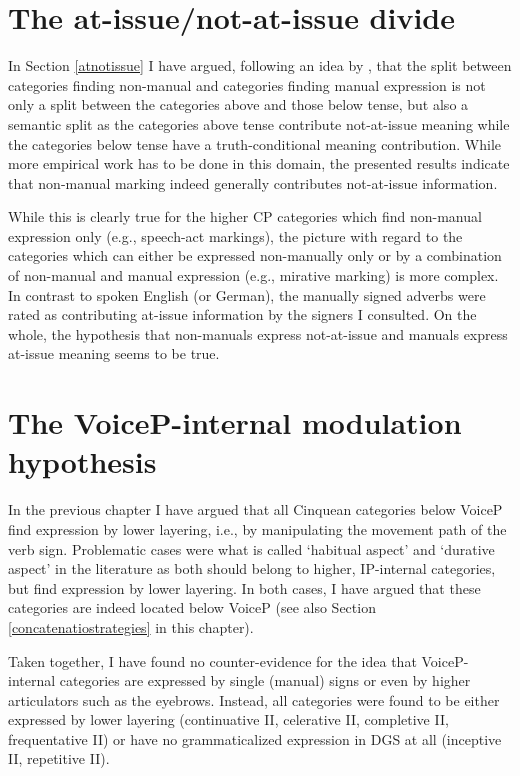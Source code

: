 \section{The at-issue/not-at-issue divide}
In Section \ref{atnotissue} I have argued, following an idea by \citet{bross2017scope}, that the split between categories finding non-manual and categories finding manual expression is not only a split between the categories above and those below tense, but also a semantic split as the categories above tense contribute not-at-issue meaning while the categories below tense have a truth-conditional meaning contribution. While more empirical work has to be done in this domain, the presented results indicate that non-manual marking indeed generally contributes not-at-issue information. 

While this is clearly true for the higher CP categories which find non-manual expression only (e.g., speech-act markings), the picture with regard to the categories which can either be expressed non-manually only or by a combination of non-manual and manual expression (e.g., mirative marking) is more complex. In contrast to spoken English (or German), the manually signed adverbs were rated as contributing at-issue information by the signers I consulted. On the whole, the hypothesis that non-manuals express not-at-issue and manuals express at-issue meaning seems to be true. %





\section{The VoiceP-internal modulation hypothesis}
In the previous chapter I have argued that all Cinquean categories below VoiceP find expression by lower layering, i.e., by manipulating the movement path of the verb sign. Problematic cases were what is called `habitual aspect' and `durative aspect' in the literature as both should belong to higher, IP-internal categories, but find expression by lower layering. In both cases, I have argued that these categories are indeed located below VoiceP (see also Section \ref{concatenatiostrategies} in this chapter). 


Taken together, I have found no counter-evidence for the idea that VoiceP-internal categories are expressed by single (manual) signs or even by higher articulators such as the eyebrows. Instead, all categories were found to be either expressed by lower layering (continuative II, celerative II, completive II, frequentative II) or have no grammaticalized expression in DGS at all (inceptive II, repetitive II). 


